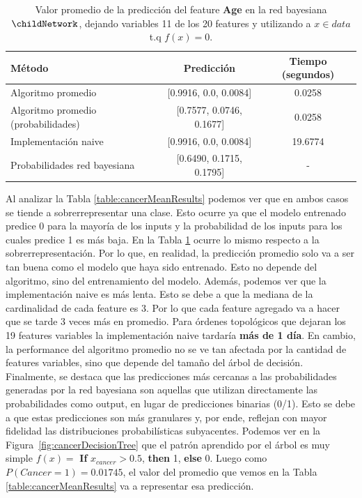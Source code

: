 \begin{table}[ht]
    \centering
    \begin{tabular}{l c c}
        \toprule
        \textbf{M\'etodo} & \textbf{Predicci\'on} & \textbf{Tiempo (segundos)} \\
        \midrule
        Algoritmo promedio & [0.9916, 0.0, 0.0084] & 0.0258 \\
        Algoritmo promedio (probabilidades) & [0.7577, 0.0746, 0.1677] & 0.0258 \\
        Implementaci\'on naive & [0.9916, 0.0, 0.0084] & 19.6774 \\
        Probabilidades red bayesiana & [0.6490, 0.1715, 0.1795] & - \\
        \bottomrule
    \end{tabular}
    \caption{Valor promedio de la predicci\'on del feature \textbf{Age} en la red bayesiana $\childNetwork$, dejando variables 11 de los 20 features y utilizando a $x\in data$ t.q $f(x)=0$.}
    \label{table:childMeanResults}
\end{table}

Al analizar la Tabla \ref{table:cancerMeanResults} podemos ver que en ambos casos se tiende a sobrerrepresentar una clase. Esto ocurre ya que el modelo entrenado predice 0 para la mayoría de los inputs y la probabilidad de los inputs para los cuales predice 1 es más baja. En la Tabla \ref{table:childMeanResults} ocurre lo mismo respecto a la sobrerrepresentación. Por lo que, en realidad, la predicción promedio solo va a ser tan buena como el modelo que haya sido entrenado. Esto no depende del algoritmo, sino del entrenamiento del modelo.
Además, podemos ver que la implementación naive es más lenta. Esto se debe a que la mediana de la cardinalidad de cada feature es 3. Por lo que cada feature agregado va a hacer que se tarde 3 veces más en promedio. Para órdenes topológicos que dejaran los 19 features variables la implementación naive tardaría \textbf{más de 1 día}. En cambio, la performance del algoritmo promedio no se ve tan afectada por la cantidad de features variables, sino que depende del tamaño del árbol de decisión. Finalmente, se destaca que las predicciones más cercanas a las probabilidades generadas por la red bayesiana son aquellas que utilizan directamente las probabilidades como output, en lugar de predicciones binarias (0/1). Esto se debe a que estas predicciones son más granulares y, por ende, reflejan con mayor fidelidad las distribuciones probabilísticas subyacentes. Podemos ver en la Figura~\ref{fig:cancerDecisionTree} que el patrón aprendido por el árbol es muy simple $f(x) = $ \textbf{If} $x_{cancer} > 0.5$, \textbf{then} 1, \textbf{else} 0. Luego como $P(Cancer = 1) = 0.01745$, el valor del promedio que vemos en la Tabla \ref{table:cancerMeanResults} va a representar esa predicción. 

